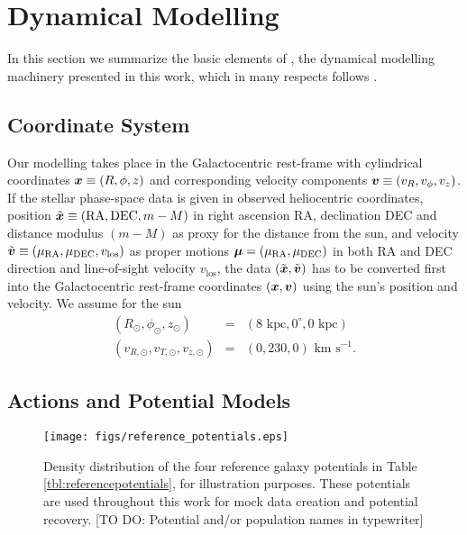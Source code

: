 \section{Dynamical Modelling}


In this section we summarize the basic elements of \RM{}, the dynamical modelling machinery presented in this work, which in many respects follows \citet{bov13}.

\subsection{Coordinate System} \label{sec:coordinates}

Our modelling takes place in the Galactocentric rest-frame with cylindrical coordinates $\boldsymbol{x} \equiv (R,\phi,z)$ and corresponding velocity components $\boldsymbol{v} \equiv (v_R,v_\phi,v_z)$. If the stellar phase-space data is given in observed heliocentric coordinates, position $\tilde{\boldsymbol{x}} \equiv(\text{RA},\text{DEC},m-M)$ in right ascension RA, declination DEC and distance modulus $(m-M)$ as proxy for the distance from the sun, and velocity $\tilde{\boldsymbol{v}} \equiv (\mu_\text{RA},\mu_\text{DEC},v_\text{los})$ as proper motions $\boldsymbol{\mu}=(\mu_\text{RA},\mu_\text{DEC})$  in both RA and DEC direction and line-of-sight velocity $v_\text{los}$, the data $(\tilde{\boldsymbol{x}},\tilde{\boldsymbol{v}})$ has to be converted first into the Galactocentric rest-frame coordinates $(\boldsymbol{x},\boldsymbol{v})$ using the sun's position and velocity. We assume for the sun
\begin{eqnarray*}
(R_\odot,\phi_\odot,z_\odot) &=&(8 \text{ kpc}, 0^\circ, 0 \text{ kpc})\\
(v_{R,\odot},v_{T,\odot},v_{z,\odot}) &=& (0,230,0) \text{ km s}^{-1}.
\end{eqnarray*}

\subsection{Actions and Potential Models}  \label{sec:potentials}



\begin{figure*}
\texttt{[image: figs/reference\_potentials.eps]}
\caption{Density distribution of the four reference galaxy potentials in Table \ref{tbl:referencepotentials}, for illustration purposes. These potentials are used throughout this work for mock data creation and potential recovery. [TO DO: Potential and/or population names in typewriter]}
\label{fig:ref_pots}
\end{figure*}

